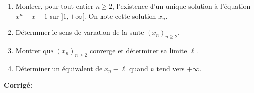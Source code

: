\documentclass[a4paper,twoside,french,10pt]{VcCours}
\newcommand{\corr}{\textbf{Corrigé:}}
\begin{document}
\medskip



\begin{Exercice}{}
\begin{enumerate}
\item Montrer, pour tout entier $n \geq 2$,  l'existence d'un unique solution à l'équation $x^n-x-1$ sur $]1, + \infty[$. On note cette solution $x_n$.
\item Déterminer le sens de variation de la suite $(x_n)_{n \geq 2}$.
\item Montrer que  $(x_n)_{n \geq 2}$ converge et déterminer sa limite $\ell$.
\item Déterminer un équivalent de $x_n- \ell$ quand $n$ tend vers $+ \infty$.
\end{enumerate}
\end{Exercice}

\corr
\end{document}
